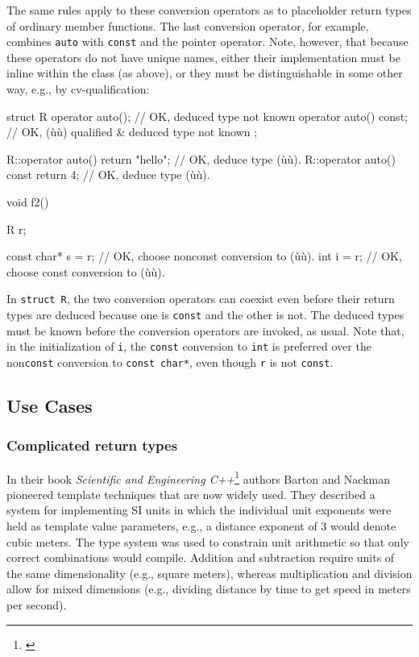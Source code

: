 \noindent The same rules apply to these conversion operators as to placeholder
return types of ordinary member functions. The last conversion operator,
for example, combines \lstinline!auto! with \lstinline!const! and the pointer
operator. Note, however, that because these operators do not have unique
names, either their implementation must be inline within the class (as
above), or they must be distinguishable in some other way, e.g., by
cv-qualification:

\begin{emcppslisting}
struct R
{
    operator auto();        // OK, deduced type not known
    operator auto() const;  // OK, (ù{}ù) qualified & deduced type not known
};

R::operator auto() { return "hello"; }  // OK, deduce type (ù{}ù).
R::operator auto() const { return 4; }  // OK, deduce type (ù{}ù).

void f2()
{
    R r;

    const char* s = r;  // OK, choose nonconst conversion to (ù{}ù).
    int         i = r;  // OK, choose const conversion to (ù{}ù).
}
\end{emcppslisting}
    

\noindent In \lstinline!struct!~\lstinline!R!, the two conversion operators can coexist
even before their return types are deduced because one is \lstinline!const!
and the other is not. The deduced types must be known before the
conversion operators are invoked, as usual. Note that, in the
initialization of \lstinline!i!, the \lstinline!const! conversion to
\lstinline!int! is preferred over the non\lstinline!const! conversion to
\lstinline!const!~\lstinline!char*!, even though \lstinline!r! is not
\lstinline!const!.

\subsection[Use Cases]{Use Cases}\label{use-cases}

\subsubsection[Complicated return types]{Complicated return types}\label{complicated-return-types}

In their book \emph{Scientific and Engineering
C++}{\cprotect\footnote{\cite{barton94}}} authors Barton and Nackman pioneered
template techniques that are now widely used. They described a system
for implementing SI units in which the individual unit exponents were
held as template value parameters, e.g., a distance exponent of 3 would
denote cubic meters. The type system was used to constrain unit
arithmetic so that only correct combinations would compile. Addition and
subtraction require units of the same dimensionality (e.g., square
meters), whereas multiplication and division allow for mixed dimensions
(e.g., dividing distance by time to get speed in meters per second).

